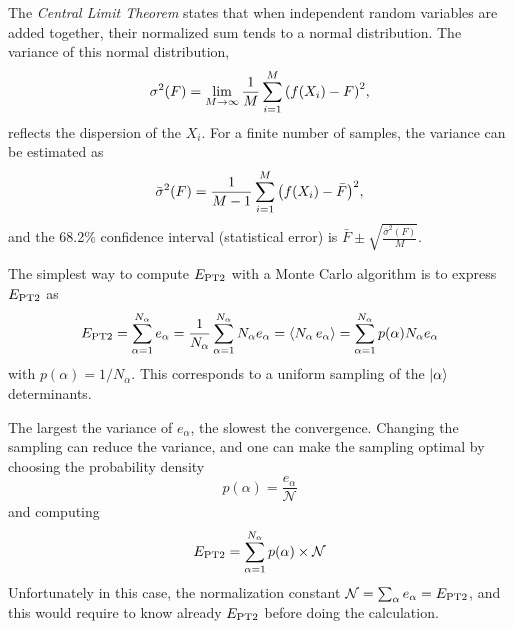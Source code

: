 \documentclass[./thesis.tex]{subfiles}
\begin{document}
The \emph{Central Limit Theorem} states that when independent random variables are added together, their normalized sum tends to a normal distribution. The variance of this normal distribution, 
\begin{equation}
\sigma^2(F) = \lim_{M\rightarrow \infty} \frac{1}{M} \sum_{i=1}^{M} \qty( f(X_i) - F)^2,
\end{equation}
reflects the dispersion of the $X_i$.
For a finite number of samples, the variance can be estimated as
\begin{equation}
\bar{\sigma}^2(F) = \frac{1}{M-1} \sum_{i=1}^{M} \qty( f(X_i) - \bar{F})^2,
\end{equation}
and the 68.2\% confidence interval (statistical error) is $\bar{F} \pm \sqrt{\frac{\bar{\sigma}^2(F)}{M}}$.

The simplest way to compute $E_\text{PT2}$ with a Monte Carlo algorithm is to express $E_\text{PT2}$ as
\begin{equation}
\EPT %
= \sum_{\alpha = 1}^{N_\alpha} e_\alpha
= \frac{1}{N_\alpha} \sum_{\alpha = 1}^{N_\alpha} N_\alpha e_\alpha
= \langle N_\alpha\, e_\alpha \rangle
= \sum_{\alpha = 1}^{N_\alpha} p(\alpha) N_\alpha e_\alpha 
\end{equation}
with $p(\alpha) = 1 / N_\alpha$. This corresponds to a uniform sampling of the ${\ket{\alpha}}$ determinants.

The largest the variance of $e_\alpha$, the slowest the convergence. Changing the sampling can reduce the variance, and one can make the sampling optimal by choosing the probability density
\begin{equation}
p(\alpha) = \frac{e_\alpha}{\mathcal{N}}
\end{equation}
and computing
\begin{equation}
E_\text{PT2} = \sum_{\alpha = 1}^{N_\alpha} p(\alpha) \times \mathcal{N}
\end{equation}
Unfortunately in this case, the normalization constant $\mathcal{N} =
\sum_\alpha e_\alpha = E_\text{PT2}$, and this would require to know already
$E_\text{PT2}$ before doing the calculation.
\end{document}
